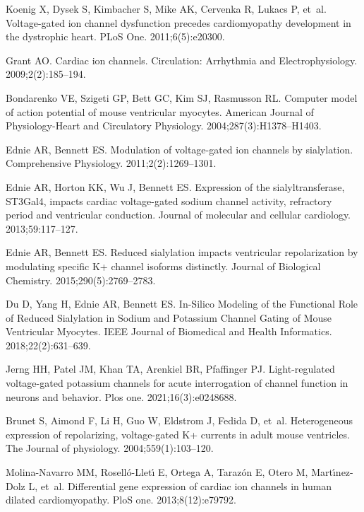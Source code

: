 \documentclass[10pt,letterpaper]{article}
\begin{document}
\begin{thebibliography}{10}
Koenig X, Dysek S, Kimbacher S, Mike AK, Cervenka R, Lukacs P, et~al.
\newblock Voltage-gated ion channel dysfunction precedes cardiomyopathy
  development in the dystrophic heart.
\newblock PLoS One. 2011;6(5):e20300.

Grant AO.
\newblock Cardiac ion channels.
\newblock Circulation: Arrhythmia and Electrophysiology. 2009;2(2):185--194.

Bondarenko VE, Szigeti GP, Bett GC, Kim SJ, Rasmusson RL.
\newblock Computer model of action potential of mouse ventricular myocytes.
\newblock American Journal of Physiology-Heart and Circulatory Physiology.
  2004;287(3):H1378--H1403.

Ednie AR, Bennett ES.
\newblock Modulation of voltage-gated ion channels by sialylation.
\newblock Comprehensive Physiology. 2011;2(2):1269--1301.

Ednie AR, Horton KK, Wu J, Bennett ES.
\newblock Expression of the sialyltransferase, ST3Gal4, impacts cardiac
  voltage-gated sodium channel activity, refractory period and ventricular
  conduction.
\newblock Journal of molecular and cellular cardiology. 2013;59:117--127.

Ednie AR, Bennett ES.
\newblock Reduced sialylation impacts ventricular repolarization by modulating
  specific K+ channel isoforms distinctly.
\newblock Journal of Biological Chemistry. 2015;290(5):2769--2783.

{Du} D, {Yang} H, {Ednie} AR, {Bennett} ES.
\newblock In-Silico Modeling of the Functional Role of Reduced Sialylation in
  Sodium and Potassium Channel Gating of Mouse Ventricular Myocytes.
\newblock IEEE Journal of Biomedical and Health Informatics.
  2018;22(2):631--639.

Jerng HH, Patel JM, Khan TA, Arenkiel BR, Pfaffinger PJ.
\newblock Light-regulated voltage-gated potassium channels for acute
  interrogation of channel function in neurons and behavior.
\newblock Plos one. 2021;16(3):e0248688.

Brunet S, Aimond F, Li H, Guo W, Eldstrom J, Fedida D, et~al.
\newblock Heterogeneous expression of repolarizing, voltage-gated K+ currents
  in adult mouse ventricles.
\newblock The Journal of physiology. 2004;559(1):103--120.

Molina-Navarro MM, Rosell{\'o}-Llet{\'\i} E, Ortega A, Taraz{\'o}n E, Otero M,
  Mart{\'\i}nez-Dolz L, et~al.
\newblock Differential gene expression of cardiac ion channels in human dilated
  cardiomyopathy.
\newblock PloS one. 2013;8(12):e79792.


\end{thebibliography}
\end{document}
